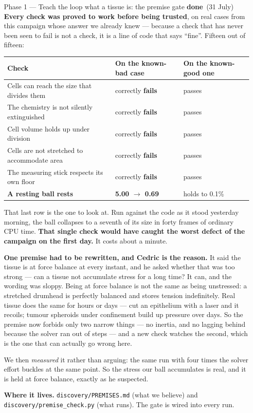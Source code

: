 \documentclass[11pt,a4paper]{article}
\newcommand{\dn}{\textcolor{good}{\textbf{done}}}
\begin{document}
\begin{phasebox}{Phase 1 --- Teach the loop what a tissue is: the premise gate \hfill \dn\ (31 July)}
\textbf{Every check was proved to work before being trusted}, on real cases from this campaign
whose answer we already knew --- because a check that has never been seen to fail is not a check,
it is a line of code that says ``fine''. Fifteen out of fifteen:

\begin{center}\small
\begin{tabular}{@{}lll@{}}
\toprule
\textbf{Check} & \textbf{On the known-bad case} & \textbf{On the known-good one} \\
\midrule
Cells can reach the size that divides them & correctly \textbf{fails} & passes \\
The chemistry is not silently extinguished & correctly \textbf{fails} & passes \\
Cell volume holds up under division        & correctly \textbf{fails} & passes \\
Cells are not stretched to accommodate area & correctly \textbf{fails} & passes \\
The measuring stick respects its own floor  & correctly \textbf{fails} & passes \\
\textbf{A resting ball rests}               & \textbf{5.00 $\to$ 0.69} & holds to 0.1\% \\
\bottomrule
\end{tabular}
\end{center}

That last row is the one to look at. Run against the code as it stood yesterday morning, the ball
collapses to a seventh of its size in forty frames of ordinary CPU time. \textbf{That single check
would have caught the worst defect of the campaign on the first day.} It costs about a minute.

\textbf{One premise had to be rewritten, and Cedric is the reason.} It said the tissue is at force
balance at every instant, and he asked whether that was too strong --- can a tissue not accumulate
stress for a long time? It can, and the wording was sloppy. Being at force balance is not the same
as being unstressed: a stretched drumhead is perfectly balanced and stores tension indefinitely.
Real tissue does the same for hours or days --- cut an epithelium with a laser and it recoils;
tumour spheroids under confinement build up pressure over days. So the premise now forbids only two
narrow things --- no inertia, and no lagging behind because the solver ran out of steps --- and a
new check watches the second, which is the one that can actually go wrong here.

We then \emph{measured} it rather than arguing: the same run with four times the solver effort
buckles at the same point. So the stress our ball accumulates is real, and it is held at force
balance, exactly as he suspected.

\textbf{Where it lives.} \texttt{discovery/PREMISES.md} (what we believe) and
\texttt{discovery/premise\_check.py} (what runs). The gate is wired into every run.
\end{phasebox}
\end{document}
